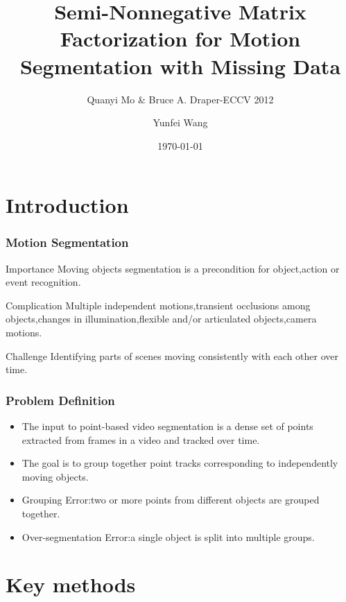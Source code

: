 \documentclass{beamer}
\title{Semi-Nonnegative Matrix Factorization for Motion Segmentation with Missing Data}
\subtitle{Quanyi Mo \& Bruce A. Draper-ECCV 2012}
\author{Yunfei Wang}
\institute{Department of Computer Science \& Technology\\Huazhong University of Science \& Technology}
\date{\today}
\begin{document}
\begin{frame}
\titlepage
\end{frame}

\begin{frame}
\tableofcontents
\end{frame}

\section{Introduction}
\begin{frame}\frametitle{Motion Segmentation}
\begin{block}{Importance}
Moving objects segmentation is a precondition for object,action or event recognition.
\end{block}
\begin{block}{Complication}
Multiple independent motions,transient occlusions among objects,changes in illumination,flexible and/or articulated objects,camera motions.
\end{block}
\begin{block}{Challenge}
Identifying parts of scenes moving consistently with each other over time.
\end{block}
\end{frame}

\begin{frame}\frametitle{Problem Definition}
\begin{itemize}
\item The input to point-based video segmentation is a dense set of points extracted from frames in a video and tracked over time.
\item The goal is to group together point tracks corresponding to independently moving objects.
\item Grouping Error:two or more points from different objects are grouped together.
\item Over-segmentation Error:a single object is split into multiple groups.
\end{itemize}
\end{frame}


\section{Key methods}
\end{document}
